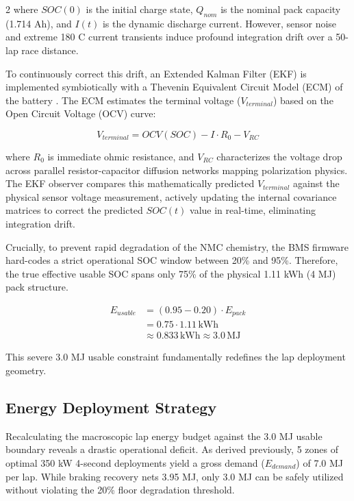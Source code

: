 \begin{multicols}{2}
where $SOC(0)$ is the initial charge state, $Q_{nom}$ is the nominal pack capacity (1.714 Ah), and $I(t)$ is the dynamic discharge current. However, sensor noise and extreme 180 C current transients induce profound integration drift over a 50-lap race distance.

To continuously correct this drift, an Extended Kalman Filter (EKF) is implemented symbiotically with a Thevenin Equivalent Circuit Model (ECM) of the battery \cite{kalman_soc_lit}. The ECM estimates the terminal voltage ($V_{terminal}$) based on the Open Circuit Voltage (OCV) curve:

\begin{equation} \label{eq:ecm_voltage}
V_{terminal} = OCV(SOC) - I \cdot R_0 - V_{RC}
\end{equation}

where $R_0$ is immediate ohmic resistance, and $V_{RC}$ characterizes the voltage drop across parallel resistor-capacitor diffusion networks mapping polarization physics. The EKF observer compares this mathematically predicted $V_{terminal}$ against the physical sensor voltage measurement, actively updating the internal covariance matrices to correct the predicted $SOC(t)$ value in real-time, eliminating integration drift.

Crucially, to prevent rapid degradation of the NMC chemistry, the BMS firmware hard-codes a strict operational SOC window between 20\% and 95\%. Therefore, the true effective usable SOC spans only 75\% of the physical 1.11 kWh (4 MJ) pack structure. 

\begin{equation} \label{eq:usable_energy}
\begin{split}
E_{usable} &= (0.95 - 0.20) \cdot E_{pack} \\
&= 0.75 \cdot 1.11\,\mathrm{kWh} \\
&\approx 0.833\,\mathrm{kWh} \approx 3.0\,\mathrm{MJ}
\end{split}
\end{equation}

This severe 3.0 MJ usable constraint fundamentally redefines the lap deployment geometry.

\subsection{Energy Deployment Strategy}

Recalculating the macroscopic lap energy budget against the 3.0 MJ usable boundary reveals a drastic operational deficit. As derived previously, 5 zones of optimal 350 kW 4-second deployments yield a gross demand ($E_{demand}$) of 7.0 MJ per lap. While braking recovery nets 3.95 MJ, only 3.0 MJ can be safely utilized without violating the 20\% floor degradation threshold.


\end{multicols}
